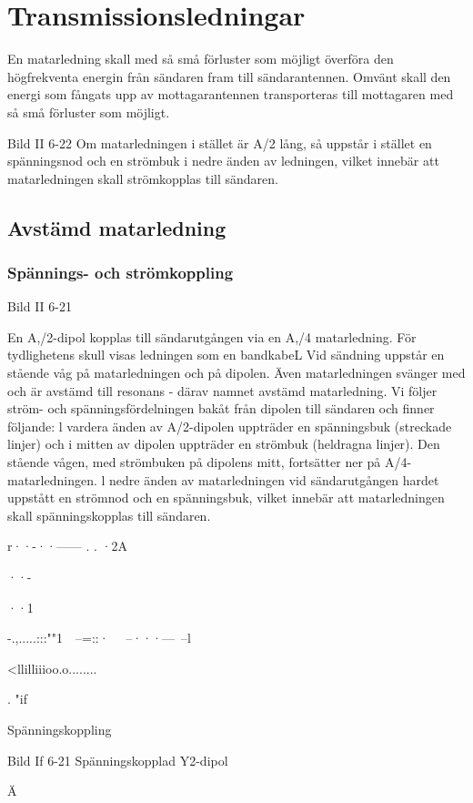\section{Transmissionsledningar}
En matarledning skall med så små förluster
som möjligt överföra den högfrekventa energin från sändaren fram till sändarantennen.
Omvänt skall den energi som fångats upp
av mottagarantennen transporteras till mottagaren med så små förluster som möjligt.

Bild II 6-22
Om matarledningen i stället är A/2 lång, så
uppstår i stället en spänningsnod och en
strömbuk i nedre änden av ledningen, vilket
innebär att matarledningen skall strömkopplas till sändaren.

\subsection{Avstämd matarledning}

\subsubsection{Spännings- och strömkoppling}

Bild II 6-21

En A,/2-dipol kopplas till sändarutgången via
en A,/4 matarledning. För tydlighetens skull
visas ledningen som en bandkabeL
Vid sändning uppstår en stående våg på
matarledningen och på dipolen. Även matarledningen svänger med och är avstämd
till resonans - därav namnet avstämd matarledning.
Vi följer ström- och spänningsfördelningen bakåt från dipolen till sändaren och finner
följande:
l vardera änden av A/2-dipolen uppträder en spänningsbuk (streckade linjer) och
i mitten av dipolen uppträder en strömbuk
(heldragna linjer). Den stående vågen, med
strömbuken på dipolens mitt, fortsätter ner
på A/4-matarledningen. l nedre änden av
matarledningen vid sändarutgången hardet
uppstått en strömnod och en spänningsbuk,
vilket innebär att matarledningen skall
spänningskopplas till sändaren.

r··-··------ . . ·2A

··-

··1

-.,.....:::""1~~--=::·~ ~--···---~--l

<llilliiioo.o........

. "if

Spänningskoppling

Bild If 6-21 Spänningskopplad Y2-dipol

Ä

